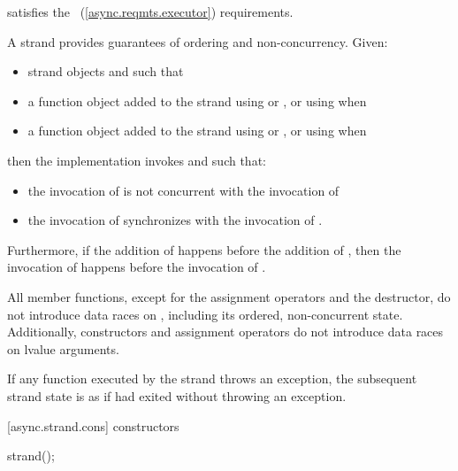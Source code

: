 \pnum
{} satisfies the ~(\ref{async.reqmts.executor}) requirements.

\pnum
 A strand provides guarantees of ordering and non-concurrency. Given:

\begin{itemize}
\item
strand objects  and  such that 

\item
a function object  added to the strand  using  or , or using  when 

\item
a function object  added to the strand  using  or , or using  when 
\end{itemize}

\pnum
then the implementation invokes  and  such that:

\begin{itemize}
\item
the invocation of  is not concurrent with the invocation of 

\item
the invocation of  synchronizes with the invocation of .
\end{itemize}

\pnum
Furthermore, if the addition of  happens before the addition of , then the invocation of  happens before the invocation of .

\pnum
All member functions, except for the assignment operators and the destructor, do not introduce data races on , including its ordered, non-concurrent state. Additionally, constructors and assignment operators do not introduce data races on lvalue arguments.

\pnum
If any function  executed by the strand throws an exception, the subsequent strand state is as if  had exited without throwing an exception.


[async.strand.cons]{ constructors}

\begin{itemdecl}
strand();
\end{itemdecl}

